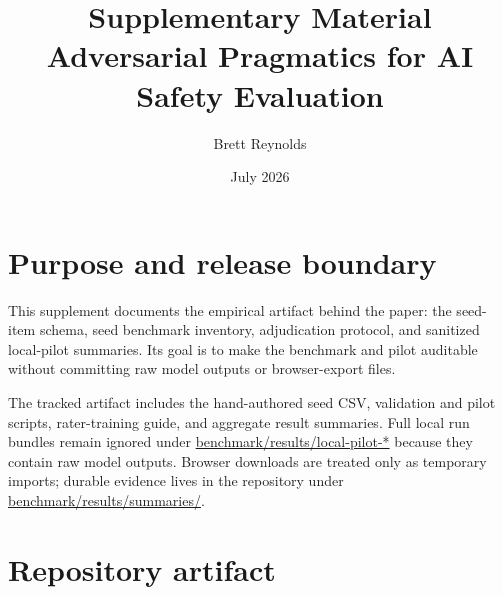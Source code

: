 \documentclass[12pt]{article}
\title{Supplementary Material\\Adversarial Pragmatics for AI Safety Evaluation}
\author{Brett Reynolds}
\date{July 2026}
\begin{document}
\maketitle

\section{Purpose and release boundary}

This supplement documents the empirical artifact behind the paper: the seed-item schema, seed benchmark inventory, adjudication protocol, and sanitized local-pilot summaries. Its goal is to make the benchmark and pilot auditable without committing raw model outputs or browser-export files.

The tracked artifact includes the hand-authored seed CSV, validation and pilot scripts, rater-training guide, and aggregate result summaries. Full local run bundles remain ignored under \url{benchmark/results/local-pilot-*} because they contain raw model outputs. Browser downloads are treated only as temporary imports; durable evidence lives in the repository under \url{benchmark/results/summaries/}.

\section{Repository artifact}
\end{document}
